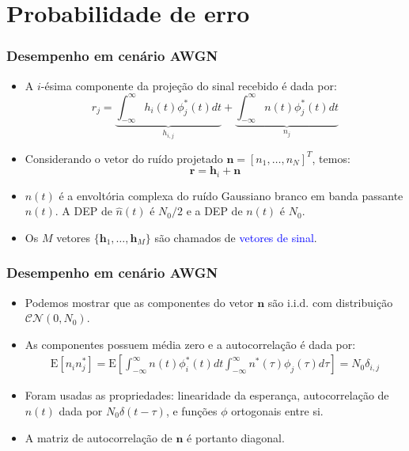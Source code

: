 \section{Probabilidade de erro}

\begin{frame}
	\frametitle{Desempenho em cenário AWGN}

	\begin{itemize}
	    \item A $i$-ésima componente da projeção do sinal recebido é dada por:
	    \begin{equation*}
		    r_j = \underbrace{\int_{-\infty}^{\infty} h_i(t)\phi_j^*(t) dt}_{h_{i,j}} + \underbrace{\int_{-\infty}^{\infty} n(t)\phi_j^*(t) dt}_{n_j}
	    \end{equation*}
	    \item Considerando o vetor do ruído projetado $\mathbf{n}=[n_1,\ldots,n_N]^T$, temos:
	    \begin{equation*}
		    \mathbf{r} = \mathbf{h}_i + \mathbf{n}
	    \end{equation*}
	    \item $n(t)$ é a envoltória complexa do ruído Gaussiano branco em banda passante $\hat{n}(t)$. A DEP de $\hat{n}(t)$ é $N_0/2$ e a DEP de $n(t)$ é $N_0$.
	    \item Os $M$ vetores $\{\mathbf{h}_1,\ldots,\mathbf{h}_M \}$ são chamados de \textcolor{blue}{vetores de sinal}.
	\end{itemize}
\end{frame}

\begin{frame}
	\frametitle{Desempenho em cenário AWGN}

	\begin{itemize}
	    \item Podemos mostrar que as componentes do vetor $\mathbf{n}$ são i.i.d. com distribuição $\mathcal{CN}(0,N_0)$.
	    \item As componentes possuem média zero e a autocorrelação é dada por:
	    \begin{align*}
		\mathrm{E}[n_i n_j^*] = \mathrm{E}\left[\int_{-\infty}^{\infty} n(t)\phi_i^*(t) dt  \int_{-\infty}^{\infty} n^*(\tau)\phi_j(\tau) d\tau \right] = N_0 \delta_{i,j}
	    \end{align*}
	    \item Foram usadas as propriedades: linearidade da esperança, autocorrelação de $n(t)$ dada por $N_0\delta(t-\tau)$, e funções $\phi$ ortogonais entre si.
	    \item A matriz de autocorrelação de $\mathbf{n}$ é portanto diagonal.
	\end{itemize}
\end{frame}


